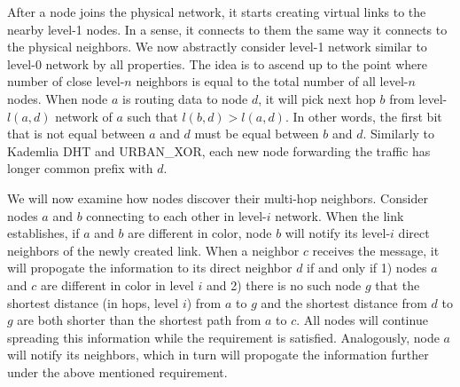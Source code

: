 \documentclass[14pt]{extarticle}
\newcommand{\urbanxor}{URBAN\_XOR}
\begin{document}
After a node joins the physical network, it starts creating virtual links to the nearby level-1 nodes. In a sense, it connects to them the same way it connects to the physical neighbors. We now abstractly consider level-1 network similar to level-0 network by all properties. The idea is to ascend up to the point where number of close level-$n$ neighbors is equal to the total number of all level-$n$ nodes. When node $a$ is routing data to node $d$, it will pick next hop $b$ from level-$l(a,d)$ network of $a$ such that $l(b,d) > l(a,d)$. In other words, the first bit that is not equal between $a$ and $d$ must be equal between $b$ and $d$. Similarly to Kademlia DHT and \urbanxor, each new node forwarding the traffic has longer common prefix with $d$.


We will now examine how nodes discover their multi-hop neighbors. Consider nodes $a$ and $b$ connecting to each other in level-$i$ network. When the link establishes, if $a$ and $b$ are different in color, node $b$ will notify its level-$i$ direct neighbors of the newly created link. When a neighbor $c$ receives the message, it will propogate the information to its direct neighbor $d$ if and only if 1) nodes $a$ and $c$ are different in color in level $i$ and 2) there is no such node $g$ that the shortest distance (in hops, level $i$) from $a$ to $g$ and the shortest distance from $d$ to $g$ are both shorter than the shortest path from $a$ to $c$. All nodes will continue spreading this information while the requirement is satisfied. Analogously, node $a$ will notify its neighbors, which in turn will propogate the information further under the above mentioned requirement.





\end{document}
